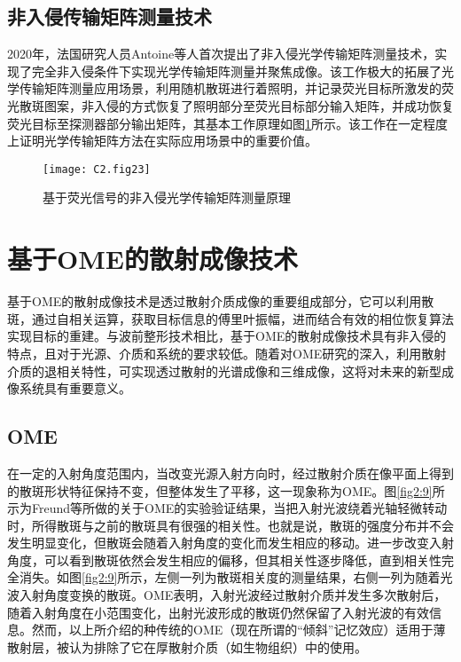\subsection{非入侵传输矩阵测量技术}

2020年，法国研究人员Antoine等\cite{boniface_non_invasive_2020}人首次提出了非入侵光学传输矩阵测量技术，实现了完全非入侵条件下实现光学传输矩阵测量并聚焦成像。该工作极大的拓展了光学传输矩阵测量应用场景，利用随机散斑进行着照明，并记录荧光目标所激发的荧光散斑图案，非入侵的方式恢复了照明部分至荧光目标部分输入矩阵，并成功恢复荧光目标至探测器部分输出矩阵，其基本工作原理如图\ref{fig2:23}所示\cite{boniface_non_invasive_2020}。该工作在一定程度上证明光学传输矩阵方法在实际应用场景中的重要价值。

\begin{figure}[htp]
	\centering
	\texttt{[image: C2.fig23]}
	\caption{基于荧光信号的非入侵光学传输矩阵测量原理}
	\label{fig2:23}
\end{figure}


\section{基于OME的散射成像技术}

基于OME的散射成像技术是透过散射介质成像的重要组成部分，它可以利用散斑，通过自相关运算，获取目标信息的傅里叶振幅，进而结合有效的相位恢复算法实现目标的重建。与波前整形技术相比，基于OME的散射成像技术具有非入侵的特点，且对于光源、介质和系统的要求较低。随着对OME研究的深入，利用散射介质的退相关特性，可实现透过散射的光谱成像\cite{park_multispectral_2013,stewart_toward_2017}和三维成像\cite{Pegard2016,holekamp_fast_2008}，这将对未来的新型成像系统具有重要意义。

\subsection{OME}

在一定的入射角度范围内，当改变光源入射方向时，经过散射介质在像平面上得到的散斑形状特征保持不变，但整体发生了平移，这一现象称为OME。图\ref{fig2:9}所示为Freund等\cite{Freund1988}所做的关于OME的实验验证结果，当把入射光波绕着光轴轻微转动时，所得散斑与之前的散斑具有很强的相关性。也就是说，散斑的强度分布并不会发生明显变化，但散斑会随着入射角度的变化而发生相应的移动。进一步改变入射角度，可以看到散斑依然会发生相应的偏移，但其相关性逐步降低，直到相关性完全消失。如图\ref{fig2:9}所示，左侧一列为散斑相关度的测量结果，右侧一列为随着光波入射角度变换的散斑。OME表明，入射光波经过散射介质并发生多次散射后，随着入射角度在小范围变化，出射光波形成的散斑仍然保留了入射光波的有效信息。然而，以上所介绍的种传统的OME（现在所谓的“倾斜”记忆效应）适用于薄散射层，被认为排除了它在厚散射介质（如生物组织）中的使用。

